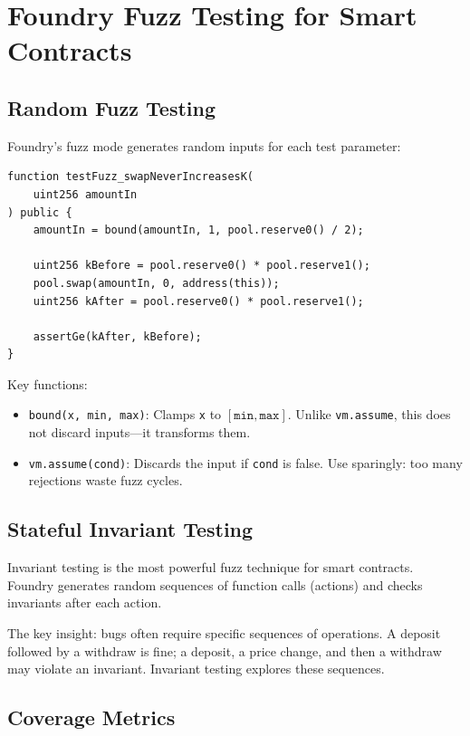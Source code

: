 \section{Foundry Fuzz Testing for Smart Contracts}


\subsection{Random Fuzz Testing}

Foundry's fuzz mode generates random inputs for each test parameter:

\begin{lstlisting}[language=Solidity,caption={Foundry fuzz test with bound}]
function testFuzz_swapNeverIncreasesK(
    uint256 amountIn
) public {
    amountIn = bound(amountIn, 1, pool.reserve0() / 2);

    uint256 kBefore = pool.reserve0() * pool.reserve1();
    pool.swap(amountIn, 0, address(this));
    uint256 kAfter = pool.reserve0() * pool.reserve1();

    assertGe(kAfter, kBefore);
}
\end{lstlisting}

Key functions:
\begin{itemize}[nosep]
  \item \texttt{bound(x, min, max)}: Clamps \texttt{x} to $[\texttt{min}, \texttt{max}]$.
    Unlike \texttt{vm.assume}, this does not discard inputs---it transforms them.
  \item \texttt{vm.assume(cond)}: Discards the input if \texttt{cond} is false. Use
    sparingly: too many rejections waste fuzz cycles.
\end{itemize}

\subsection{Stateful Invariant Testing}

Invariant testing is the most powerful fuzz technique for smart contracts. Foundry
generates random sequences of function calls (actions) and checks invariants after each
action.

The key insight: bugs often require specific sequences of operations. A deposit followed
by a withdraw is fine; a deposit, a price change, and then a withdraw may violate an
invariant. Invariant testing explores these sequences.

\subsection{Coverage Metrics}

